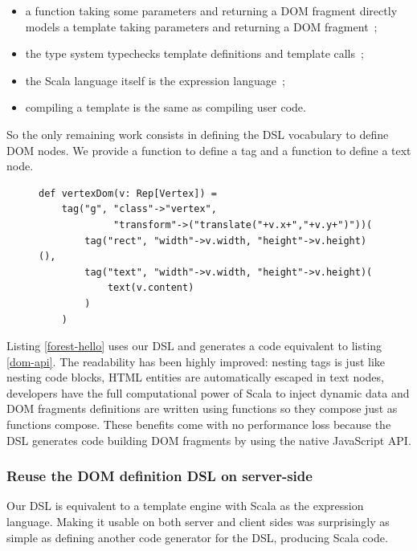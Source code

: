 \documentclass[american,english,runningheads]{llncs}
\begin{document}
\begin{itemize}
\item a function taking some parameters and returning a DOM fragment directly models a template taking parameters and
returning a DOM fragment~;
\item the type system typechecks template definitions and template calls~;
\item the Scala language itself is the expression language~;
\item compiling a template is the same as compiling user code.
\end{itemize}

So the only remaining work consists in defining the DSL vocabulary to define DOM nodes. We provide a 
function to define a tag and a  function to define a text node.

\begin{figure}
\begin{lstlisting}[label=forest-hello,caption=DOM definition DSL]
def vertexDom(v: Rep[Vertex]) =
    tag("g", "class"->"vertex",
             "transform"->("translate("+v.x+","+v.y+")"))(
        tag("rect", "width"->v.width, "height"->v.height)(),
        tag("text", "width"->v.width, "height"->v.height)(
            text(v.content)
        )
    )
\end{lstlisting}
\end{figure}

Listing \ref{forest-hello} uses our DSL and generates a code equivalent to listing \ref{dom-api}. The readability has
been highly improved: nesting tags is just like nesting code blocks, HTML entities are
automatically escaped in text nodes, developers have the full computational power of Scala to inject dynamic data and
DOM fragments definitions are written using functions so they compose just as functions compose. These benefits come
with no performance loss because the DSL generates code building DOM fragments by using the native JavaScript API.

\subsubsection{Reuse the DOM definition DSL on server-side}

Our DSL is equivalent to a template engine with Scala as the expression language. Making it usable on both server and
client sides was surprisingly as simple as defining another code generator for the DSL, producing Scala code.
\end{document}
